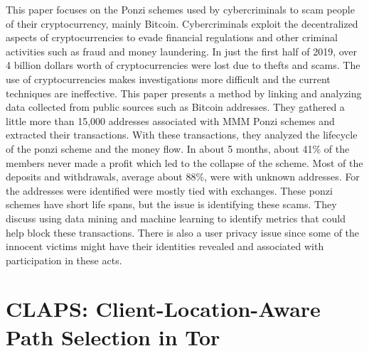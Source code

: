 \documentclass{article}
\begin{document}
This paper focuses on the Ponzi schemes used by cybercriminals to scam people of their cryptocurrency, mainly Bitcoin. Cybercriminals exploit the decentralized aspects of cryptocurrencies to evade financial regulations and other criminal activities such as fraud and money laundering. In just the first half of 2019, over 4 billion dollars worth of cryptocurrencies were lost due to thefts and scams. The use of cryptocurrencies makes investigations more difficult and the current techniques are ineffective. This paper presents a method by linking and analyzing data collected from public sources such as Bitcoin addresses. They gathered a little more than 15,000 addresses associated with MMM Ponzi schemes and extracted their transactions. With these transactions, they analyzed the lifecycle of the ponzi scheme and the money flow. In about 5 months, about 41\% of the members never made a profit which led to the collapse of the scheme. Most of the deposits and withdrawals, average about 88\%, were with unknown addresses. For the addresses were identified were mostly tied with exchanges. These ponzi schemes have short life spans, but the issue is identifying these scams. They discuss using data mining and machine learning to identify metrics that could help block these transactions. There is also a user privacy issue since some of the innocent victims might have their identities revealed and associated with participation in these acts.

\section{CLAPS: Client-Location-Aware Path Selection in Tor \cite{10.1145/3372297.3417279}}
\end{document}
